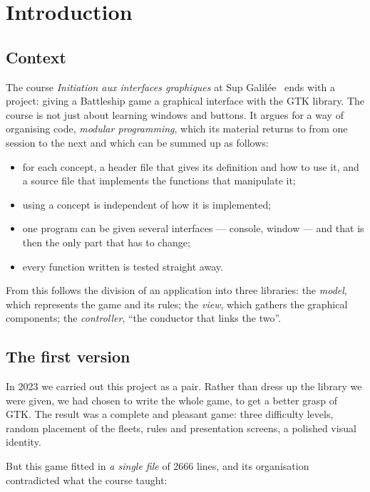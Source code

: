 \chapter{Introduction}
\label{chap-introduction}

\section{Context}

The course \emph{Initiation aux interfaces graphiques} at Sup Galilée~\cite{toulouse2023}
ends with a project: giving a Battleship game a graphical interface with the GTK library.
The course is not just about learning windows and buttons. It argues for a way of organising
code, \emph{modular programming}, which its material returns to from one session to the next
and which can be summed up as follows:

\begin{itemize}
    \item for each concept, a header file that gives its definition and how to use it, and a
          source file that implements the functions that manipulate it;
    \item using a concept is independent of how it is implemented;
    \item one program can be given several interfaces --- console, window --- and that is
          then the only part that has to change;
    \item every function written is tested straight away.
\end{itemize}

From this follows the division of an application into three libraries: the \emph{model},
which represents the game and its rules; the \emph{view}, which gathers the graphical
components; the \emph{controller}, \enquote{the conductor that links the two}.

\section{The first version}

In 2023 we carried out this project as a pair. Rather than dress up the library we were
given, we had chosen to write the whole game, to get a better grasp of GTK. The result was a
complete and pleasant game: three difficulty levels, random placement of the fleets, rules
and presentation screens, a polished visual identity.

But this game fitted in \emph{a single file} of \num{2666} lines, and its organisation
contradicted what the course taught:

